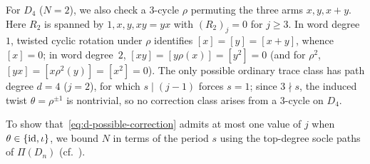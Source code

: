 For $D_4$ ($N=2$), we also check a $3$-cycle $\rho$ permuting the three arms $x,y,x+y$. Here $R_2$ is spanned by $1,x,y,xy=yx$ with $(R_2)_j=0$ for $j\geq3$. In word degree~$1$, twisted cyclic rotation under $\rho$ identifies $[x]=[y]=[x+y]$, whence $[x]=0$; in word degree~$2$, $[xy]=[y\rho(x)]=[y^2]=0$ (and for $\rho^2$, $[yx]=[x\rho^2(y)]=[x^2]=0$). The only possible ordinary trace class has path degree $d=4$ ($j=2$), for which $s\mid(j-1)$ forces $s=1$; since $3\nmid s$, the induced twist $\theta=\rho^{\pm1}$ is nontrivial, so no correction class arises from a $3$-cycle on $D_4$.

To show that~\eqref{eq:d-possible-correction} admits at most one value of $j$ when $\theta\in\{\operatorname{id},\iota\}$, we bound $N$ in terms of the period $s$ using the top-degree socle paths of $\Pi(D_n)$ (cf.\ \cite[Section~6.2]{Kaplan}).

